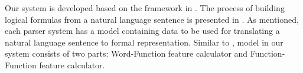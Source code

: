 \label{sec:model}
Our system is developed based on the framework in \cite{Clarke:2010:DSP:1870568.1870571}. The process of building logical formulas from a natural language sentence is presented in \cite{Clarke:2010:DSP:1870568.1870571}.
As mentioned, each parser system has a model containing data to be used for translating a natural language sentence to formal representation. Similar to \cite{Clarke:2010:DSP:1870568.1870571}, model in our system consists of two parts: Word-Function feature calculator and Function-Function feature calculator.


